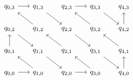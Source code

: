 \[
  \begin{tikzcd}[row sep=1.7em, column sep=1.7em]
  q_{0,3} \arrow[r]  & q_{1,3} \arrow[dr] & q_{2,3} \arrow[r]  & q_{3,3} \arrow[dr] & q_{4,3} \\
  q_{0,2} \arrow[dr] & q_{1,2} \arrow[ul] & q_{2,2} \arrow[dr] & q_{3,2} \arrow[ul] & q_{4,2} \arrow[u] \\
  q_{0,1} \arrow[u]  & q_{1,1} \arrow[dr] & q_{2,1} \arrow[ul] & q_{3,1} \arrow[dr] & q_{4,1} \arrow[ul] \\
  q_{0,0} \arrow[r]  & q_{1,0} \arrow[ul] & q_{2,0} \arrow[r]  & q_{3,0} \arrow[ul] & q_{4,0} \arrow[u]
  \end{tikzcd}
\]